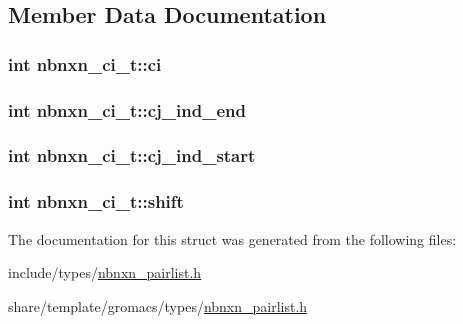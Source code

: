 \subsection{\-Member \-Data \-Documentation}
\hypertarget{structnbnxn__ci__t_a49335491df32fed25b76043fbfbd6845}{
\subsubsection[{ci}]{\setlength{\rightskip}{0pt plus 5cm}int {\bf nbnxn\-\_\-ci\-\_\-t\-::ci}}}\label{structnbnxn__ci__t_a49335491df32fed25b76043fbfbd6845}
\hypertarget{structnbnxn__ci__t_af23072e3b54ee14afa05fe5eec11f383}{
\subsubsection[{cj\-\_\-ind\-\_\-end}]{\setlength{\rightskip}{0pt plus 5cm}int {\bf nbnxn\-\_\-ci\-\_\-t\-::cj\-\_\-ind\-\_\-end}}}\label{structnbnxn__ci__t_af23072e3b54ee14afa05fe5eec11f383}
\hypertarget{structnbnxn__ci__t_a7cce522fb52b4c60176f5aabd31af187}{
\subsubsection[{cj\-\_\-ind\-\_\-start}]{\setlength{\rightskip}{0pt plus 5cm}int {\bf nbnxn\-\_\-ci\-\_\-t\-::cj\-\_\-ind\-\_\-start}}}\label{structnbnxn__ci__t_a7cce522fb52b4c60176f5aabd31af187}
\hypertarget{structnbnxn__ci__t_aff10c0c556095e1f0eb09b940c0a1886}{
\subsubsection[{shift}]{\setlength{\rightskip}{0pt plus 5cm}int {\bf nbnxn\-\_\-ci\-\_\-t\-::shift}}}\label{structnbnxn__ci__t_aff10c0c556095e1f0eb09b940c0a1886}


\-The documentation for this struct was generated from the following files\-:\begin{DoxyCompactItemize}
\item 
include/types/\hyperlink{include_2types_2nbnxn__pairlist_8h}{nbnxn\-\_\-pairlist.\-h}\item 
share/template/gromacs/types/\hyperlink{share_2template_2gromacs_2types_2nbnxn__pairlist_8h}{nbnxn\-\_\-pairlist.\-h}\end{DoxyCompactItemize}
